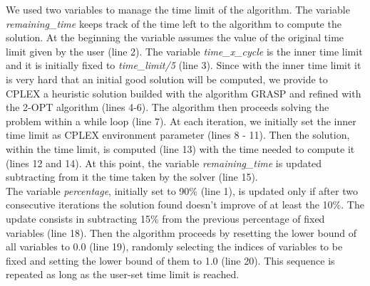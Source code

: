 We used two variables to manage the time limit of the algorithm. The variable \textit{remaining\_time} keeps track of the time left to the algorithm to compute the solution. At the beginning the variable assumes the value of the original time limit given by the user (line 2). The variable \textit{time\_x\_cycle} is the inner time limit and it is initially fixed to \textit{time\_limit/5} (line 3). Since with the inner time limit it is very hard that an initial good solution will be computed, we provide to CPLEX a heuristic solution builded with the algorithm GRASP and refined with the 2-OPT algorithm (lines 4-6).
The algorithm then proceeds solving the problem within a while loop (line 7). At each iteration, we initially set the inner time limit as CPLEX environment parameter (lines 8 - 11). 
Then the solution, within the time limit, is computed (line 13) with the time needed to compute it (lines 12 and 14).
At this point, the variable \textit{remaining\_time} is updated subtracting from it the time taken by the solver (line 15).
\\ The variable \textit{percentage}, initially set to 90\% (line 1), is updated only if after two consecutive iterations the solution found doesn't improve of at least the 10\%. The update consists in subtracting 15\% from the previous percentage of fixed variables (line 18). Then the algorithm proceeds by resetting the lower bound of all variables to 0.0 (line 19), randomly selecting the indices of variables to be fixed and setting the lower bound of them to 1.0 (line 20). This sequence is repeated as long as the user-set time limit is reached.


